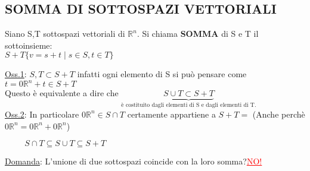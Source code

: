 
\subsection{SOMMA DI SOTTOSPAZI VETTORIALI}
\enlargethispage{1\linewidth}
\begin{definition}
	Siano S,T sottospazi vettoriali di $\mathbb{R}^n$. Si chiama \textbf{SOMMA} di S e T il sottoinsieme: \\
	\centering \( S + T \{ v = s + t \mid s \in S, t \in T\}\)
\end{definition}

\newpage
\textsf{\underline{Oss.1}: $S, T \subset S + T$ infatti ogni elemento di S si può pensare come $t = 0\mathbb{R}^n + t \in S + T$}\\
\textsf{\small Questo è equivalente a dire che $\boxed{\underbrace{S \cup T \subset S + T} _{\text{è costituito dagli elementi di S e dagli elementi di T.}}}$}\\

\textsf{\underline{Oss.2}: In particolare $0\mathbb{R}^n \in S \cap T$ certamente appartiene a $S + T =$ (Anche perchè $0\mathbb{R}^n = 0\mathbb{R}^n + 0\mathbb{R}^n$)}\\

\noindent\begin{minipage}{.5\linewidth}
\end{minipage}
\begin{minipage}{.45\linewidth}
$ \hspace{1cm}\boxed{S \cap T \subseteq S \cup T \subseteq S + T}$
\end{minipage}

\textsf{\underline{Domanda}: L'unione di due sottospazi coincide con la loro somma?}\textsf{\small \textcolor{red}{\underline{\underline{NO!}}}}\\

